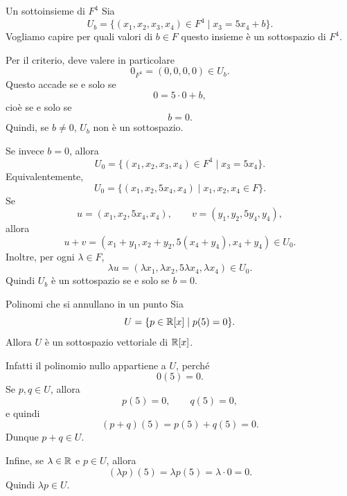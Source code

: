 \documentclass[a4paper]{article}
\begin{document}
\begin{snippetexample}{Un sottoinsieme di \(F^4\)}
    Sia
    \[
        U_b=\{(x_1,x_2,x_3,x_4)\in F^4\mid x_3=5x_4+b\}.
    \]
    Vogliamo capire per quali valori di \(b\in F\) questo insieme è un sottospazio di \(F^4\).

    Per il criterio, deve valere in particolare
    \[
        0_{F^4}=(0,0,0,0)\in U_b.
    \]
    Questo accade se e solo se
    \[
        0=5\cdot 0+b,
    \]
    cioè se e solo se
    \[
        b=0.
    \]
    Quindi, se \(b\neq 0\), \(U_b\) non è un sottospazio.

    Se invece \(b=0\), allora
    \[
        U_0=\{(x_1,x_2,x_3,x_4)\in F^4\mid x_3=5x_4\}.
    \]
    Equivalentemente,
    \[
        U_0=\{(x_1,x_2,5x_4,x_4)\mid x_1,x_2,x_4\in F\}.
    \]
    Se
    \[
        u=(x_1,x_2,5x_4,x_4),
        \qquad
        v=(y_1,y_2,5y_4,y_4),
    \]
    allora
    \[
        u+v
        =
        (x_1+y_1,x_2+y_2,5(x_4+y_4),x_4+y_4)\in U_0.
    \]
    Inoltre, per ogni \(\lambda\in F\),
    \[
        \lambda u
        =
        (\lambda x_1,\lambda x_2,5\lambda x_4,\lambda x_4)\in U_0.
    \]
    Quindi \(U_b\) è un sottospazio se e solo se \(b=0\).
\end{snippetexample}

\begin{snippetexample}{Polinomi che si annullano in un punto}
    Sia
    \[
        U=\{p\in\mathbb{R}[x]\mid p(5)=0\}.
    \]
    Allora \(U\) è un sottospazio vettoriale di \(\mathbb{R}[x]\).

    Infatti il polinomio nullo appartiene a \(U\), perché
    \[
        0(5)=0.
    \]
    Se \(p,q\in U\), allora
    \[
        p(5)=0,
        \qquad
        q(5)=0,
    \]
    e quindi
    \[
        (p+q)(5)=p(5)+q(5)=0.
    \]
    Dunque \(p+q\in U\).

    Infine, se \(\lambda\in\mathbb{R}\) e \(p\in U\), allora
    \[
        (\lambda p)(5)=\lambda p(5)=\lambda\cdot 0=0.
    \]
    Quindi \(\lambda p\in U\).
\end{snippetexample}
\end{document}
